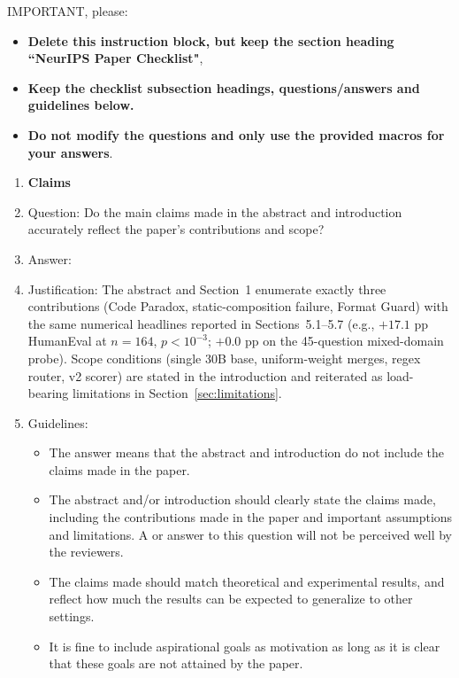 IMPORTANT, please:
\begin{itemize}
    \item {\bf Delete this instruction block, but keep the section heading ``NeurIPS Paper Checklist"},
    \item  {\bf Keep the checklist subsection headings, questions/answers and guidelines below.}
    \item {\bf Do not modify the questions and only use the provided macros for your answers}.
\end{itemize} 
 



\begin{enumerate}

\item {\bf Claims}
    \item[] Question: Do the main claims made in the abstract and introduction accurately reflect the paper's contributions and scope?
    \item[] Answer: \answerYes{}
    \item[] Justification: The abstract and Section~1 enumerate exactly three contributions (Code Paradox, static-composition failure, Format Guard) with the same numerical headlines reported in Sections~5.1--5.7 (e.g., $+17.1$ pp HumanEval at $n=164$, $p<10^{-3}$; $+0.0$ pp on the 45-question mixed-domain probe). Scope conditions (single 30B base, uniform-weight merges, regex router, v2 scorer) are stated in the introduction and reiterated as load-bearing limitations in Section~\ref{sec:limitations}.
    \item[] Guidelines:
    \begin{itemize}
        \item The answer \answerNA{} means that the abstract and introduction do not include the claims made in the paper.
        \item The abstract and/or introduction should clearly state the claims made, including the contributions made in the paper and important assumptions and limitations. A \answerNo{} or \answerNA{} answer to this question will not be perceived well by the reviewers. 
        \item The claims made should match theoretical and experimental results, and reflect how much the results can be expected to generalize to other settings. 
        \item It is fine to include aspirational goals as motivation as long as it is clear that these goals are not attained by the paper. 
    \end{itemize}


\end{enumerate}
